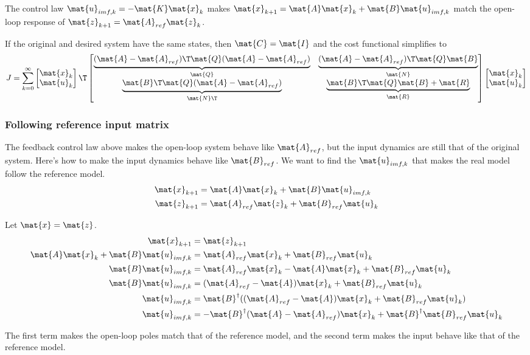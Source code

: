 The control law $\mat{u}_{imf,k} = -\mat{K}\mat{x}_k$ makes
$\mat{x}_{k+1} = \mat{A}\mat{x}_k + \mat{B}\mat{u}_{imf,k}$ match the open-loop
response of $\mat{z}_{k+1} = \mat{A}_{ref}\mat{z}_k$.

If the original and desired system have the same states, then
$\mat{C} = \mat{I}$ and the cost functional simplifies to
\begin{equation}
  J = \sum_{k=0}^\infty
  \begin{bmatrix}
    \mat{x}_k \\
    \mat{u}_k
  \end{bmatrix}\T
  \begin{bmatrix}
    \underbrace{(\mat{A} - \mat{A}_{ref})\T\mat{Q}
      (\mat{A} - \mat{A}_{ref})}_{\mat{Q}} &
    \underbrace{(\mat{A} - \mat{A}_{ref})\T\mat{Q}\mat{B}}_{\mat{N}} \\
    \underbrace{\mat{B}\T\mat{Q}(\mat{A} - \mat{A}_{ref})}_{\mat{N}\T} &
    \underbrace{\mat{B}\T\mat{Q}\mat{B} + \mat{R}}_{\mat{R}}
  \end{bmatrix}
  \begin{bmatrix}
    \mat{x}_k \\
    \mat{u}_k
  \end{bmatrix}
\end{equation}

\subsubsection{Following reference input matrix}

The feedback control law above makes the open-loop system behave like
$\mat{A}_{ref}$, but the input dynamics are still that of the original system.
Here's how to make the input dynamics behave like $\mat{B}_{ref}$. We want to
find the $\mat{u}_{imf,k}$ that makes the real model follow the reference model.
\begin{align*}
  \mat{x}_{k+1} &= \mat{A}\mat{x}_k + \mat{B}\mat{u}_{imf,k} \\
  \mat{z}_{k+1} &= \mat{A}_{ref}\mat{z}_k + \mat{B}_{ref}\mat{u}_k
\end{align*}

Let $\mat{x} = \mat{z}$.
\begin{align*}
  \mat{x}_{k+1} &= \mat{z}_{k+1} \\
  \mat{A}\mat{x}_k + \mat{B}\mat{u}_{imf,k} &= \mat{A}_{ref}\mat{x}_k +
    \mat{B}_{ref}\mat{u}_k \\
  \mat{B}\mat{u}_{imf,k} &= \mat{A}_{ref}\mat{x}_k - \mat{A}\mat{x}_k +
    \mat{B}_{ref}\mat{u}_k \\
  \mat{B}\mat{u}_{imf,k} &= (\mat{A}_{ref} - \mat{A})\mat{x}_k +
    \mat{B}_{ref}\mat{u}_k \\
  \mat{u}_{imf,k} &= \mat{B}^\dagger ((\mat{A}_{ref} - \mat{A})\mat{x}_k +
    \mat{B}_{ref}\mat{u}_k) \\
  \mat{u}_{imf,k} &= -\mat{B}^\dagger (\mat{A} - \mat{A}_{ref})\mat{x}_k +
    \mat{B}^\dagger \mat{B}_{ref}\mat{u}_k
\end{align*}

The first term makes the open-loop poles match that of the reference model, and
the second term makes the input behave like that of the reference model.
